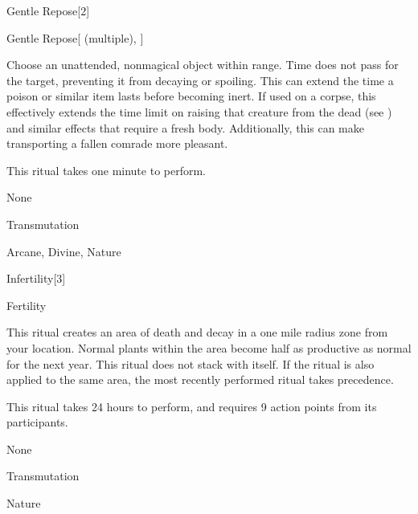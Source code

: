 \begin{spellsection}{Gentle Repose}[2]


\begin{ability}{Gentle Repose}[ (multiple), ]

Choose an unattended, nonmagical object within \rngclose range.
Time does not pass for the target, preventing it from decaying or spoiling.
This can extend the time a poison or similar item lasts before becoming inert.
If used on a corpse, this effectively extends the time limit on raising that creature from the dead (see ) and similar effects that require a fresh body.
Additionally, this can make transporting a fallen comrade more pleasant.

This ritual takes one minute to perform.

\end{ability}


 None

 Transmutation

 Arcane, Divine, Nature
\end{spellsection}


\begin{spellsection}{Infertility}[3]


\begin{ability}{Fertility}

This ritual creates an area of death and decay in a one mile radius zone from your location.
Normal plants within the area become half as productive as normal for the next year.
This ritual does not stack with itself.
If the  ritual is also applied to the same area, the most recently performed ritual takes precedence.

This ritual takes 24 hours to perform, and requires 9 action points from its participants.

\end{ability}


 None

 Transmutation

 Nature
\end{spellsection}


